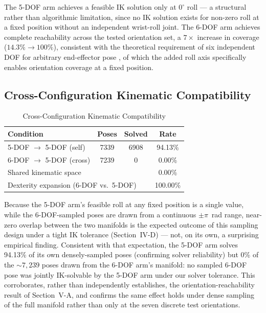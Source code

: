 \documentclass[conference]{IEEEtran}
\begin{document}
	The 5-DOF arm achieves a feasible IK solution only at $0^\circ$ roll
	— a structural rather than algorithmic limitation, since no IK
	solution exists for non-zero roll at a fixed position without an
	independent wrist-roll joint. The 6-DOF arm achieves complete
	reachability across the tested orientation set, a $7\times$ increase
	in coverage ($14.3\%\rightarrow100\%$), consistent with the
	theoretical requirement of six independent DOF for arbitrary
	end-effector pose \cite{craig2005introduction, whitney1969resolved},
	of which the added roll axis specifically enables orientation
	coverage at a fixed position.
	
	\subsection{Cross-Configuration Kinematic Compatibility}
	
	\begin{table}[t]
		\centering
		\caption{Cross-Configuration Kinematic Compatibility}
		\label{tab:cross}
		\small
		\begin{tabular}{lccc}
			\toprule
			\textbf{Condition} & \textbf{Poses} & \textbf{Solved} & \textbf{Rate} \\
			\midrule
			5-DOF $\rightarrow$ 5-DOF (self)  & 7339 & 6908 & 94.13\% \\
			6-DOF $\rightarrow$ 5-DOF (cross) & 7239 &    0 &  0.00\% \\
			\midrule
			\multicolumn{3}{l}{Shared kinematic space} & 0.00\% \\
			\multicolumn{3}{l}{Dexterity expansion (6-DOF vs.\ 5-DOF)} & 100.00\% \\
			\bottomrule
		\end{tabular}
	\end{table}
	
	Because the 5-DOF arm's feasible roll at any fixed position is a
	single value, while the 6-DOF-sampled poses are drawn from a
	continuous $\pm\pi$~rad range, near-zero overlap between the two
	manifolds is the expected outcome of this sampling design under a
	tight IK tolerance (Section~IV-D) — not, on its own, a surprising
	empirical finding. Consistent with that expectation, the 5-DOF arm
	solves 94.13\% of its own densely-sampled poses (confirming solver
	reliability) but 0\% of the ${\sim}7{,}239$ poses drawn from the
	6-DOF arm's manifold: no sampled 6-DOF pose was jointly IK-solvable
	by the 5-DOF arm under our solver tolerance. This corroborates,
	rather than independently establishes, the orientation-reachability
	result of Section~V-A, and confirms the same effect holds under
	dense sampling of the full manifold rather than only at the seven
	discrete test orientations.
	
\end{document}
